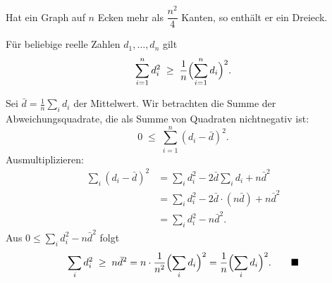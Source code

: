 \begin{merksatz}
Hat ein Graph auf $n$ Ecken mehr als $\dfrac{n^2}{4}$ Kanten, so enthält er ein Dreieck.
\end{merksatz}

\begin{merksatz}
Für beliebige reelle Zahlen $d_1, \ldots, d_n$ gilt
\[ \sum_{i=1}^n d_i^2 \;\ge\; \frac{1}{n}\Bigl(\sum_{i=1}^n d_i\Bigr)^2 . \]

Sei $\bar{d} = \frac{1}{n}\sum_i d_i$ der Mittelwert. Wir betrachten die Summe der Abweichungsquadrate, die als Summe von Quadraten nichtnegativ ist:
\[ 0 \;\le\; \sum_{i=1}^n (d_i - \bar{d})^2 . \]
Ausmultiplizieren:
\begin{align*}
\sum_i (d_i - \bar d)^2 &= \sum_i d_i^2 - 2\bar d \sum_i d_i + n \bar d^2\\
&= \sum_i d_i^2 - 2\bar d \cdot (n\bar d) + n\bar d^2\\
&= \sum_i d_i^2 - n\bar d^2 .
\end{align*}
Aus $0 \le \sum_i d_i^2 - n\bar d^2$ folgt
\[ \sum_i d_i^2 \;\ge\; n \bar d^2 = n \cdot \frac{1}{n^2}\Bigl(\sum_i d_i\Bigr)^2 = \frac{1}{n}\Bigl(\sum_i d_i\Bigr)^2 . \qquad \blacksquare \]
\end{merksatz}

